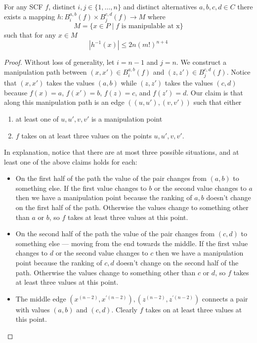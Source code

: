	\begin{lemma}
		For any SCF $f$, distinct $i, j \in \{1, \ldots, n\}$ and distinct alternatives $a, b, c, d \in C$ there exists a mapping $h : B_i^{a,b}(f) \times B_j^{c,d}(f) \rightarrow M$ where
		\[
			M = \{x \in P \mid f \text{ is manipulable at x}\}
		\]
		such that for any $x \in M$
		\[
			|h^{-1}(x)| \le 2n(m!)^{n+4}
		\]
	\end{lemma}
	\begin{proof}
		Without loss of generality, let $i = n - 1$ and $j = n$. We construct a manipulation path between $(x, x') \in B_i^{a,b}(f)$ and $(z, z') \in B_j^{c,d}(f)$. Notice that $(x, x')$ takes the values $(a, b)$ while $(z, z')$ takes the values $(c, d)$ because $f(x) = a$, $f(x') = b$, $f(z) = c$, and $f(z') = d$. Our claim is that along this manipulation path is an edge $((u, u'), (v, v'))$ such that either
		\begin{enumerate}
			\item at least one of $u, u', v, v'$ is a manipulation point
			\item $f$ takes on at least three values on the points $u, u', v, v'$.
		\end{enumerate}
		In explanation, notice that there are at most three possible situations, and at least one of the above claims holds for each:
		\begin{itemize}
			\item On the first half of the path the value of the pair changes from $(a, b)$ to something else. If the first value changes to $b$ or the second value changes to $a$ then we have a manipulation point because the ranking of $a, b$ doesn't change on the first half of the path. Otherwise the values change to something other than $a$ or $b$, so $f$ takes at least three values at this point.
			\item On the second half of the path the value of the pair changes from $(c, d)$ to something else --- moving from the end towards the middle. If the first value changes to $d$ or the second value changes to $c$ then we have a manipulation point because the ranking of $c, d$ doesn't change on the second half of the path. Otherwise the values change to something other than $c$ or $d$, so $f$ takes at least three values at this point.
			\item The middle edge $(x^{(n-2)}, x^{\prime(n-2)}), (z^{(n-2)}, z^{\prime(n-2)})$ connects a pair with values $(a, b)$ and $(c, d)$. Clearly $f$ takes on at least three values at this point.
		\end{itemize}


\end{proof}
